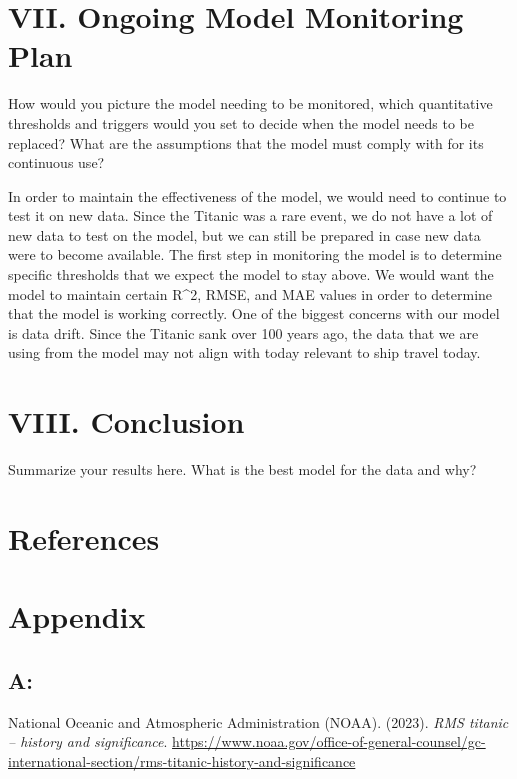 \documentclass[
  letterpaper,
  DIV=11,
  numbers=noendperiod]{scrartcl}
\newlength{\cslhangindent}
\newenvironment{CSLReferences}[2] %
 {\begin{list}{}{%
  \setlength{\itemindent}{0pt}
  \setlength{\leftmargin}{0pt}
  \setlength{\parsep}{0pt}
  \ifodd #1
   \setlength{\leftmargin}{\cslhangindent}
   \setlength{\itemindent}{-1\cslhangindent}
  \fi
  \setlength{\itemsep}{#2\baselineskip}}}
 {\end{list}}
\begin{document}
\section{VII. Ongoing Model Monitoring
Plan}\label{vii.-ongoing-model-monitoring-plan}

How would you picture the model needing to be monitored, which
quantitative thresholds and triggers would you set to decide when the
model needs to be replaced? What are the assumptions that the model must
comply with for its continuous use?

In order to maintain the effectiveness of the model, we would need to
continue to test it on new data. Since the Titanic was a rare event, we
do not have a lot of new data to test on the model, but we can still be
prepared in case new data were to become available. The first step in
monitoring the model is to determine specific thresholds that we expect
the model to stay above. We would want the model to maintain certain
R\^{}2, RMSE, and MAE values in order to determine that the model is
working correctly. One of the biggest concerns with our model is data
drift. Since the Titanic sank over 100 years ago, the data that we are
using from the model may not align with today relevant to ship travel
today.

\section{VIII. Conclusion}\label{viii.-conclusion}

Summarize your results here. What is the best model for the data and
why?

\section{References}\label{references}

\section{Appendix}\label{appendix}

\subsection*{A:}\label{a}

\label{refs}
\begin{CSLReferences}{1}{0}
National Oceanic and Atmospheric Administration (NOAA). (2023).
\emph{RMS titanic -- history and significance}.
\url{https://www.noaa.gov/office-of-general-counsel/gc-international-section/rms-titanic-history-and-significance}

\end{CSLReferences}
\end{document}
